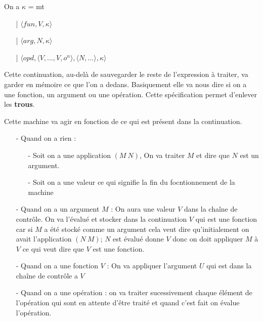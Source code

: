 \documentclass[10pt,a4paper]{article}
\begin{document}
				On a $\kappa$ = mt
				\begin{itemize}
					\item[|] $\langle fun,V,\kappa \rangle$
					\item[|] $\langle arg,N,\kappa \rangle$
					\item[|] $\langle opd,\langle V,...,V,o^{n}\rangle,\langle N,... \rangle,\kappa \rangle$
				\end{itemize}
				\smallbreak
				Cette continuation, au-delà de sauvegarder le reste de l'expression à traiter, va garder en mémoire ce que l'on a dedans. Basiquement elle va nous dire si on a une fonction, un argument ou une opération. Cette spécification permet d'enlever les \textbf{trous}.
				\medbreak
				
				Cette machine va agir en fonction de ce qui est présent dans la continuation.
				\begin{itemize}
					\item[] - Quand on a rien :
					\begin{itemize}
						\item[] - Soit on a une application $(M~N)$, On va traiter $M$ et dire que $N$ est un argument.
						\item[] - Soit on a une valeur ce qui signifie la fin du focntionnement de la machine
					\end{itemize}
					\item[] - Quand on a un argument $M$ : On aura une valeur $V$ dans la chaîne de contrôle. On va l'évalué et stocker dans la continuation $V$ qui est une fonction car si $M$ a été stocké comme un argument cela veut dire qu'initialement on avait l'application $(N~M)$; $N$ est évalué donne $V$ donc on doit appliquer $M$ à $V$ ce qui veut dire que $V$ est une fonction.
					\item[] - Quand on a une fonction $V$ : On va appliquer l'argument $U$ qui est dans la chaîne de contrôle a $V$
					\item[] - Quand on a une opération : on va traiter sucessivement chaque élément de l'opération qui sont en attente d'être traité et quand c'est fait on évalue l'opération. 
				\end{itemize}
				\bigbreak
				
\end{document}
